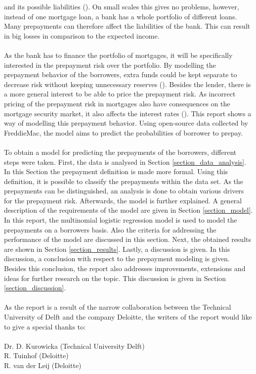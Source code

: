 and its possible liabilities (\cite{jacobs2005modelling}). 
On small scales this gives no problems, however, instead of one 
mortgage loan, a bank has a whole portfolio of different loans. 
Many prepayments can therefore affect the liabilities of the bank. This 
can result in big losses in comparison to the expected income.  
\\\\
As the bank has to finance the portfolio of mortgages, it will 
be specifically interested in the prepayment risk over the portfolio.
By modelling the prepayment behavior of the borrowers, extra funds could be 
kept separate to decrease risk without keeping unnecessary 
reserves (\cite{jacobs2005modelling}).
Besides the lender, there is a more general interest to be able 
to price the prepayment risk. As incorrect pricing of the prepayment risk 
in mortgages also have consequences on the mortgage security market, it also 
affects the interest rates (\cite{Chinloy1989}).  
This report shows a way of modelling this prepayment behavior. 
Using open-source data collected by FreddieMac, the model aims to predict 
the probabilities of borrower to prepay. 
\\\\
To obtain a model for predicting the prepayments of the borrowers, 
different steps were taken.
First, the data is analysed in Section \ref{section_data_analysis}. In 
this Section the prepayment definition is made more formal. Using this 
definition, it is possible to classify the prepayments within the data set. 
As the prepayments can be distinguished, an analysis is done to obtain 
various drivers for the prepayment risk. Afterwards, the model is further 
explained. A general description of the requirements of the model are given in 
Section \ref{section_model}. In this report, the multinomial logistic regression 
model is used to model the prepayments on a borrowers basis. Also the criteria 
for addressing the performance of the model are discussed in this section.   
Next, the obtained results are shown in Section \ref{section_results}. Lastly, 
a discussion is given. In this discussion, a conclusion with respect to the 
prepayment modeling is given. Besides this conclusion, the report also addresses 
improvements, extensions and ideas for further research on the topic. 
This discussion is given in Section \ref{section_discussion}.
\\\\
As the report is a result of the narrow collaboration between the Technical 
University of Delft and the company Deloitte, the writers of the report would 
like to give a special thanks to:
\\\\
Dr. D. Kurowicka (Technical University Delft)  \\
R. Tuinhof (Deloitte)                           \\
R. van der Leij (Deloitte)
